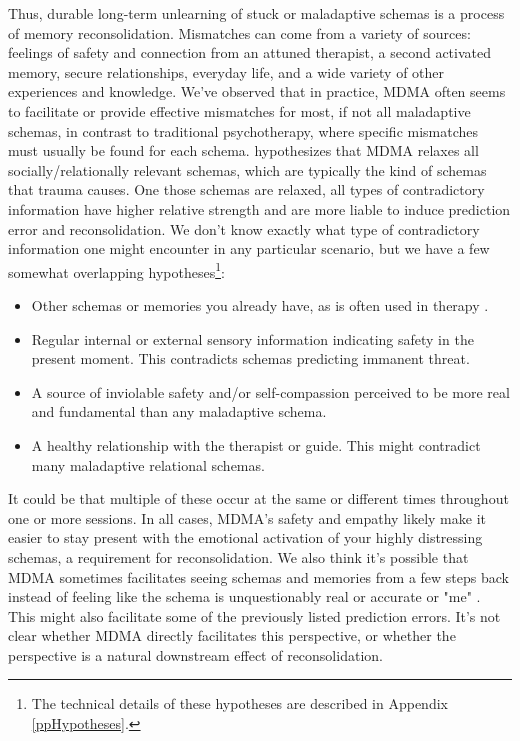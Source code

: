 \documentclass[12pt,letterpaper]{book}
\begin{document}
Thus, durable long-term unlearning of stuck or maladaptive schemas is a process of memory reconsolidation. Mismatches can come from a variety of sources: feelings of safety and connection from an attuned therapist, a second activated memory, secure relationships, everyday life, and a wide variety of other experiences and knowledge. We've observed that in practice, MDMA often seems to facilitate or provide effective mismatches for most, if not all maladaptive schemas, in contrast to traditional psychotherapy, where specific mismatches must usually be found for each schema. \textcite{carhart2019rebus} hypothesizes that MDMA relaxes all socially/relationally relevant schemas, which are typically the kind of schemas that trauma causes. One those schemas are relaxed, all types of contradictory information have higher relative strength and are more liable to induce prediction error and reconsolidation. We don't know exactly what type of contradictory information one might encounter in any particular scenario, but we have a few somewhat overlapping hypotheses\footnote{The technical details of these hypotheses are described in Appendix \ref{ppHypotheses}.}:
\begin{itemize}
	\item Other schemas or memories you already have, as is often used in therapy \cite{eckerUnlocking}.
	\item Regular internal or external sensory information indicating safety in the present moment. This contradicts schemas predicting immanent threat.
	\item A source of inviolable safety and/or self-compassion perceived to be more real and fundamental than any maladaptive schema.
	\item A healthy relationship with the therapist or guide. This might contradict many maladaptive relational schemas.
\end{itemize}
It could be that multiple of these occur at the same or different times throughout one or more sessions. In all cases, MDMA's safety and empathy likely make it easier to stay present with the emotional activation of your highly distressing schemas, a requirement for reconsolidation. We also think it's possible that MDMA sometimes facilitates seeing schemas and memories from a few steps back instead of feeling like the schema is unquestionably real or accurate or "me" . This might also facilitate some of the previously listed prediction errors. It's not clear whether MDMA directly facilitates this perspective, or whether the perspective is a natural downstream effect of reconsolidation.
\end{document}
